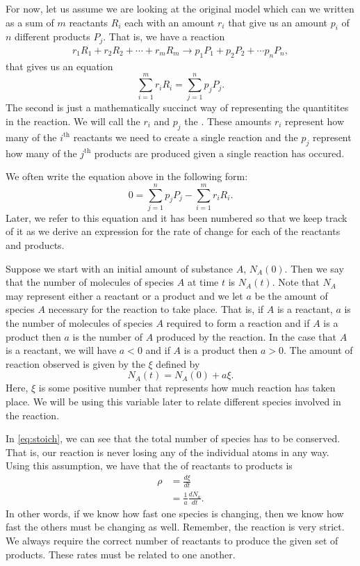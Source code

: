        For now, let us assume we are looking at the original model which can we written as a sum of $m$ reactants $R_i$ each with an amount $r_i$ that give us an amount $p_i$ of $n$ different products $P_j$. That is, we have a reaction
        \begin{align*}
            r_1R_1 + r_2R_2 + \cdots + r_mR_m \to p_1 P_1 + p_2P_2 +\cdots p_n P_n,
        \end{align*}
        that gives us an equation
        \[
        \sum_{i=1}^m r_iR_i = \sum_{j=1}^n p_jP_j.
        \]
        The second is just a mathematically succinct way of representing the quantitites in the reaction. We will call the $r_i$ and $p_j$ the .  These amounts $r_i$ represent how many of the $i^\textrm{th}$ reactants we need to create a single reaction and the $p_j$ represent how many of the $j^\textrm{th}$ products are produced given a single reaction has occured.

        We often write the equation above in the following form:
        \begin{equation}
        0=\sum_{j=1}^n p_j P_j - \sum_{i=1}^m r_iR_i. \label{eq:stoich}
        \end{equation}
        Later, we refer to this equation and it has been numbered so that we keep track of it as we derive an expression for the rate of change for each of the reactants and products.

        Suppose we start with an initial amount of substance $A$, $N_A(0)$. Then we say that the number of molecules of species $A$ at time $t$ is $N_{A}(t)$. Note that $N_A$ may represent either a reactant or a product and we let $a$ be the amount of species $A$ necessary for the reaction to take place.  That is, if $A$ is a reactant, $a$ is the number of molecules of species $A$ required to form a reaction and if $A$ is a product then $a$ is the number of $A$ produced by the reaction. In the case that $A$ is a reactant, we will have $a<0$ and if $A$ is a product then $a>0$. The amount of reaction observed is given by the  $\xi$ defined by
        \[
        N_A(t) = N_A(0)+a\xi.
        \]
        Here, $\xi$ is some positive number that represents how much reaction has taken place.  We will be using this variable later to relate different species involved in the reaction.

        In \ref{eq:stoich}, we can see that the total number of species has to be conserved. That is, our reaction is never losing any of the individual atoms in any way.  Using this assumption, we have that the  of reactants to products is
        \begin{align*}
            \rho &= \frac{d\xi}{dt}\\
            &= \frac{1}{a}\frac{dN_a}{dt}.
        \end{align*}
        In other words, if we know how fast one species is changing, then we know how fast the others must be changing as well.  Remember, the reaction is very strict.  We always require the correct number of reactants to produce the given set of products.  These rates must be related to one another.

